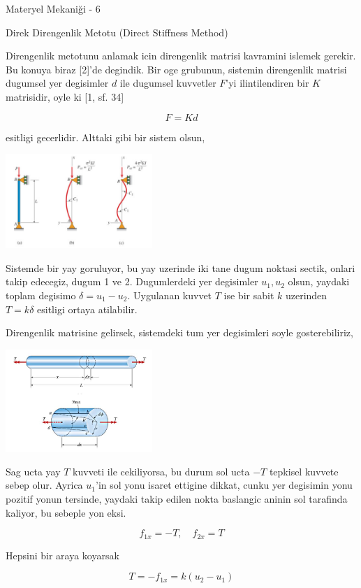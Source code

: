 \documentclass[12pt,fleqn]{article}\usepackage{../../common}
\begin{document}
Materyel Mekaniği - 6

Direk Direngenlik Metotu (Direct Stiffness Method)

Direngenlik metotunu anlamak icin direngenlik matrisi kavramini islemek
gerekir. Bu konuya biraz [2]'de degindik. Bir oge grubunun, sistemin direngenlik
matrisi dugumsel yer degisimler $d$ ile dugumsel kuvvetler $F$'yi ilintilendiren
bir $K$ matrisidir, oyle ki [1, sf. 34]

$$
F = K d
$$

esitligi gecerlidir. Alttaki gibi bir sistem olsun,

\includegraphics[width=15em]{phy_020_strs_06_03.jpg}

Sistemde bir yay goruluyor, bu yay uzerinde iki tane dugum noktasi sectik,
onlari takip edecegiz, dugum 1 ve 2. Dugumlerdeki yer degisimler $u_1,u_2$
olsun, yaydaki toplam degisimo $\delta = u_1 - u_2$. Uygulanan kuvvet $T$
ise bir sabit $k$ uzerinden $T = k \delta$ esitligi ortaya atilabilir.

Direngenlik matrisine gelirsek, sistemdeki tum yer degisimleri soyle gosterebiliriz,

\includegraphics[width=15em]{phy_020_strs_06_04.jpg}

Sag ucta yay $T$ kuvveti ile cekiliyorsa, bu durum sol ucta $-T$ tepkisel
kuvvete sebep olur. Ayrica $u_1$'in sol yonu isaret ettigine dikkat, cunku yer
degisimin yonu pozitif yonun tersinde, yaydaki takip edilen nokta baslangic
aninin sol tarafinda kaliyor, bu sebeple yon eksi.

$$
f_{1x} = -T, \quad f_{2x} = T
$$

Hepsini bir araya koyarsak

$$
T = -f_{1x} = k (u_2 - u_1)
$$
\end{document}
